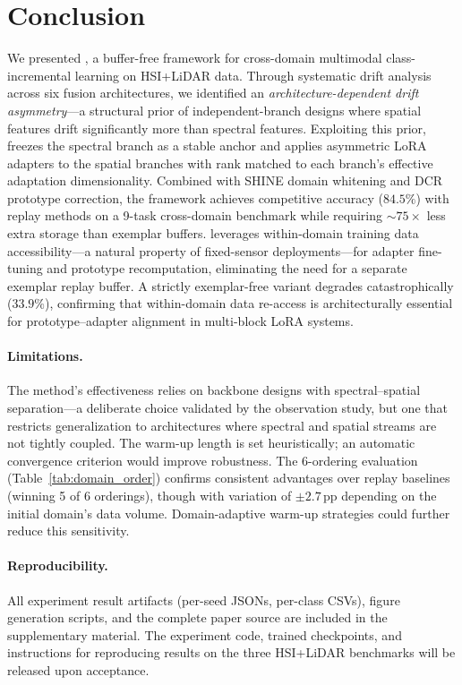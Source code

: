 \section{Conclusion}
\label{sec:conclusion}

We presented \methodname{}, a buffer-free framework for cross-domain multimodal class-incremental learning on HSI+LiDAR data.
Through systematic drift analysis across six fusion architectures, we identified an \emph{architecture-dependent drift asymmetry}---a structural prior of independent-branch designs where spatial features drift significantly more than spectral features.
Exploiting this prior, \methodname{} freezes the spectral branch as a stable anchor and applies asymmetric LoRA adapters to the spatial branches with rank matched to each branch's effective adaptation dimensionality.
Combined with SHINE domain whitening and DCR prototype correction, the framework achieves competitive accuracy ($84.5\%$) with replay methods on a 9-task cross-domain benchmark while requiring ${\sim}75\times$ less extra storage than exemplar buffers.
\methodname{} leverages within-domain training data accessibility---a natural property of fixed-sensor deployments---for adapter fine-tuning and prototype recomputation, eliminating the need for a separate exemplar replay buffer.
A strictly exemplar-free variant degrades catastrophically ($33.9\%$), confirming that within-domain data re-access is architecturally essential for prototype--adapter alignment in multi-block LoRA systems.

\paragraph{Limitations.}
The method's effectiveness relies on backbone designs with spectral--spatial separation---a deliberate choice validated by the observation study, but one that restricts generalization to architectures where spectral and spatial streams are not tightly coupled.
The warm-up length is set heuristically; an automatic convergence criterion would improve robustness.
The 6-ordering evaluation (Table~\ref{tab:domain_order}) confirms consistent advantages over replay baselines (winning 5 of 6 orderings), though with variation of $\pm 2.7$\,pp depending on the initial domain's data volume.
Domain-adaptive warm-up strategies could further reduce this sensitivity.

\paragraph{Reproducibility.}
All experiment result artifacts (per-seed JSONs, per-class CSVs), figure generation scripts, and the complete paper source are included in the supplementary material.
The experiment code, trained checkpoints, and instructions for reproducing results on the three HSI+LiDAR benchmarks will be released upon acceptance.

